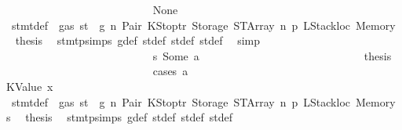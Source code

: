 \begin{isabellebody}
\ \ \ \ \ \ \ \ \ \ \ \ \ \ \ \ \ \ \ \ \ \ \ \ \ \ \isamarkupfalse%
\ None\isanewline
\ \ \ \ \ \ \ \ \ \ \ \ \ \ \ \ \ \ \ \ \ \ \ \ \ \ \isamarkupfalse%
\ {}{\isacharparenleft}{\kern0pt}{}{\isacharparenright}{\kern0pt}\ stmt{\isacharunderscore}{\kern0pt}def\ {\isacharbackquoteopen}{\isasymnot}\ gas\ st\ {\isasymle}\ g{\isacharbackquoteclose}\ n\ Pair\ KStoptr\ Storage\ STArray\ n{}\ p{}\ LStackloc\ Memory\ \isamarkupfalse%
\ {\isacharquery}{\kern0pt}thesis\ \isamarkupfalse%
\ stmt{\isachardot}{\kern0pt}psimps{\isacharparenleft}{\kern0pt}{}{\isacharparenright}{\kern0pt}\ g{\isacharunderscore}{\kern0pt}def\ st{\isacharprime}{\kern0pt}{\isacharunderscore}{\kern0pt}def\ st{\isacharprime}{\kern0pt}{\isacharprime}{\kern0pt}{\isacharunderscore}{\kern0pt}def\ st{\isacharprime}{\kern0pt}{\isacharprime}{\kern0pt}{\isacharprime}{\kern0pt}{\isacharunderscore}{\kern0pt}def\ \isamarkupfalse%
\ simp\isanewline
\ \ \ \ \ \ \ \ \ \ \ \ \ \ \ \ \ \ \ \ \ \ \ \ \isamarkupfalse%
\isanewline
\ \ \ \ \ \ \ \ \ \ \ \ \ \ \ \ \ \ \ \ \ \ \ \ \ \ \isamarkupfalse%
\ s{}{\isacharcolon}{\kern0pt}\ {\isacharparenleft}{\kern0pt}Some\ a{\isacharparenright}{\kern0pt}\isanewline
\ \ \ \ \ \ \ \ \ \ \ \ \ \ \ \ \ \ \ \ \ \ \ \ \ \ \isamarkupfalse%
\ \isamarkupfalse%
\ {\isacharquery}{\kern0pt}thesis\isanewline
\ \ \ \ \ \ \ \ \ \ \ \ \ \ \ \ \ \ \ \ \ \ \ \ \ \ \isamarkupfalse%
\ {\isacharparenleft}{\kern0pt}cases\ a{\isacharparenright}{\kern0pt}\isanewline
\ \ \ \ \ \ \ \ \ \ \ \ \ \ \ \ \ \ \ \ \ \ \ \ \ \ \ \ \isamarkupfalse%
\ {\isacharparenleft}{\kern0pt}KValue\ x{}{\isacharparenright}{\kern0pt}\isanewline
\ \ \ \ \ \ \ \ \ \ \ \ \ \ \ \ \ \ \ \ \ \ \ \ \ \ \ \ \isamarkupfalse%
\ {}{\isacharparenleft}{\kern0pt}{}{\isacharparenright}{\kern0pt}\ stmt{\isacharunderscore}{\kern0pt}def\ {\isacharbackquoteopen}{\isasymnot}\ gas\ st\ {\isasymle}\ g{\isacharbackquoteclose}\ n\ Pair\ KStoptr\ Storage\ STArray\ n{}\ p{}\ LStackloc\ Memory\ s{}\ \isamarkupfalse%
\ {\isacharquery}{\kern0pt}thesis\ \isamarkupfalse%
\ stmt{\isachardot}{\kern0pt}psimps{\isacharparenleft}{\kern0pt}{}{\isacharparenright}{\kern0pt}\ g{\isacharunderscore}{\kern0pt}def\ st{\isacharprime}{\kern0pt}{\isacharunderscore}{\kern0pt}def\ st{\isacharprime}{\kern0pt}{\isacharprime}{\kern0pt}{\isacharunderscore}{\kern0pt}def\ st{\isacharprime}{\kern0pt}{\isacharprime}{\kern0pt}{\isacharprime}{\kern0pt}{\isacharunderscore}{\kern0pt}def\ \isamarkupfalse%

\end{isabellebody}
